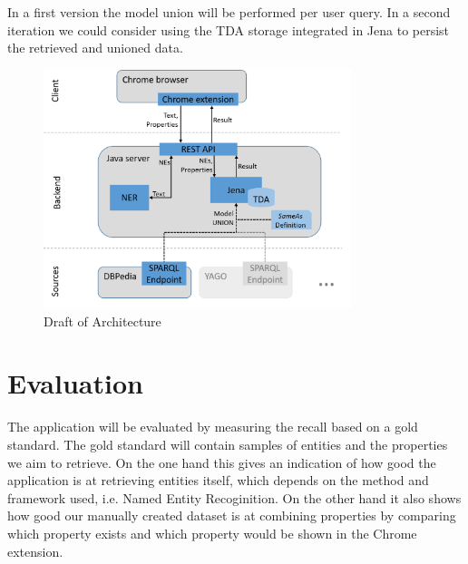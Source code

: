 \documentclass[11pt,titlepage,oneside,openany]{article}
\begin{document}
In a first version the model union will be performed per user query. In a second
iteration we could consider using the TDA storage integrated in
Jena to persist the retrieved and unioned data.

\begin{figure}[ht]
	\centering
	\includegraphics[width=0.8\textwidth]{architecture}
	\caption{Draft of Architecture}
	\label{fig:architecture}
\end{figure}


\section{Evaluation}
The application will be evaluated by measuring the recall based on a gold
standard. The gold standard will contain samples of entities and the properties
we aim to retrieve. On the one hand this gives an indication of how good the
application is at retrieving entities itself, which depends on the method and
framework used, i.e. Named Entity Recoginition. On the other hand it also shows
how good our manually created dataset is at combining properties by comparing
which property exists and which property would be shown in the Chrome extension.
\end{document}
